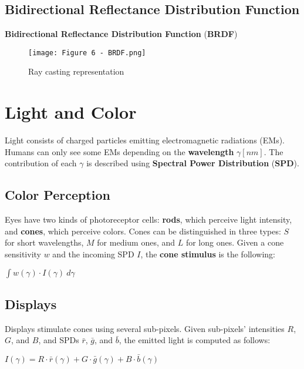\documentclass{article}
\begin{document}
\subsection{Bidirectional Reflectance Distribution Function}
\textbf{Bidirectional Reflectance Distribution Function} (\textbf{BRDF})
\begin{figure}[H]
    \centering
    \texttt{[image: Figure 6 - BRDF.png]}
    \caption{Ray casting representation}
\end{figure}

\newpage

\section{Light and Color}
Light consists of charged particles emitting electromagnetic radiations (EMs). Humans can only see some EMs depending on the \textbf{wavelength} $ \gamma [nm] $. The contribution of each $\gamma$ is described using \textbf{Spectral Power Distribution} (\textbf{SPD}).
\subsection{Color Perception}
Eyes have two kinds of photoreceptor cells: \textbf{rods}, which perceive light intensity, and \textbf{cones}, which perceive colors. Cones can be distinguished in three types: $S$ for short wavelengths, $M$ for medium ones, and $L$ for long ones. Given a cone sensitivity $w$ and the incoming SPD $I$, the \textbf{cone stimulus} is the following:
\begin{center}
    $ \int w(\gamma) \cdot I(\gamma) \ d\gamma $
\end{center}
\subsection{Displays}
Displays stimulate cones using several sub-pixels. Given sub-pixels' intensities $R$, $G$, and $B$, and SPDs $\bar{r}$, $\bar{g}$, and $\bar{b}$, the emitted light is computed as follows:
\begin{center}
    $I(\gamma) = R \cdot \bar{r}(\gamma) + G \cdot \bar{g}(\gamma) + B \cdot \bar{b}(\gamma)$
\end{center}
\end{document}
